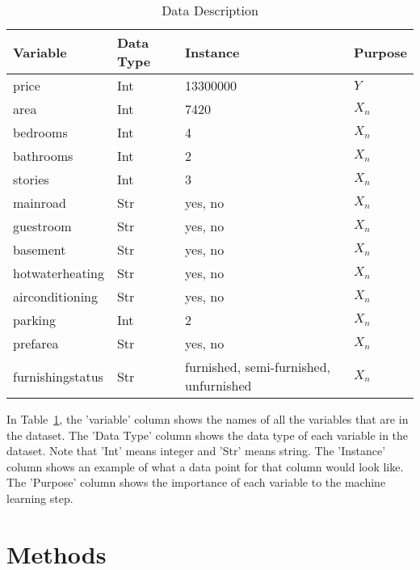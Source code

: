 \documentclass[12pt]{article}
\begin{document}
\begin{table}[h] 
\caption{Data Description}
  \label{tab:rv}
\begin{tabular}{llll}
  \toprule
Variable & Data Type & Instance & Purpose \\
  \midrule
price & Int & 13300000 & \(Y\) \\ 
area & Int & 7420 & \(X_{n}\) \\ 
bedrooms & Int & 4 & \(X_{n}\) \\ 
bathrooms & Int & 2 & \(X_{n}\) \\ 
stories & Int & 3 & \(X_{n}\) \\ 
mainroad & Str & yes, no & \(X_{n}\) \\
guestroom & Str & yes, no & \(X_{n}\) \\
basement & Str & yes, no & \(X_{n}\) \\
hotwaterheating & Str & yes, no & \(X_{n}\) \\
airconditioning & Str & yes, no & \(X_{n}\) \\
parking & Int & 2 & \(X_{n}\) \\
prefarea & Str & yes, no & \(X_{n}\) \\
furnishingstatus & Str & furnished, semi-furnished, unfurnished & \(X_{n}\) \\
   \bottomrule
\end{tabular}\par
\bigskip
In Table~\ref{tab:rv}, the 'variable' column shows the names of all the variables that are in the dataset. The 'Data Type' column shows the data type of each variable in the dataset. Note that 'Int' means integer and 'Str' means string. The 'Instance' column shows an example of what a data point for that column would look like. The 'Purpose' column shows the importance of each variable to the machine learning step.
\end{table}


\bigskip
\bigskip


\section{Methods}
\label{sec:meth}

\end{document}

